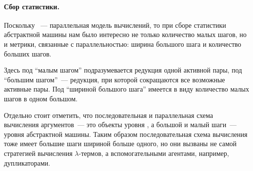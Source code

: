 \paragraph{Сбор статистики.}
Поскольку \INs{}~--- параллельная модель вычислений, то при сборе статистики абстрактной машины нам было интересно не только количество малых шагов, но и метрики, связанные с параллельностью: ширина большого шага и количество больших шагов.

Здесь под \enquote{малым шагом} подразумевается редукция одной активной пары, под \enquote{большим шагом}~--- редукция, при которой сокращаются все возможные активные пары.
Под \enquote{шириной большого шага} имеется в виду количество малых шагов в одном большом.

Отдельно стоит отметить, что последовательная и параллельная схема вычисления аргументов~--- это объекты уровня \INs{}, а большой и малый шаги~--- уровня абстрактной машины.
Таким образом последовательная схема вычисления тоже имеет большие шаги шириной больше одного, но они вызваны не самой стратегией вычисления $\lambda$-термов, а вспомогательными агентами, например, дупликаторами.

